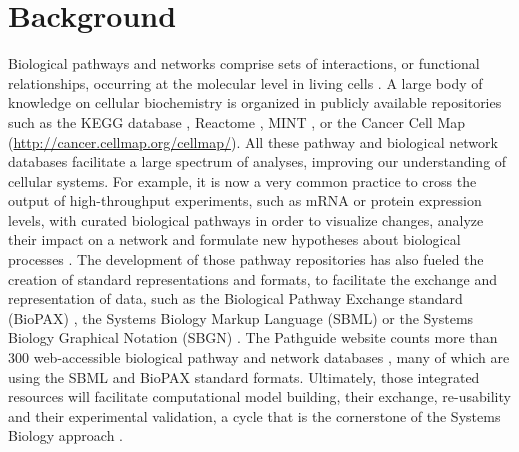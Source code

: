 \documentclass[10pt]{bmc_article}
\newenvironment{bmcformat}{\baselineskip20pt\sloppy\setboolean{publ}{false}}{\baselineskip20pt\sloppy}
\begin{document}
\begin{bmcformat}
\section*{Background}

Biological pathways and networks comprise sets of interactions, or functional
relationships, occurring at the molecular level in living cells
\cite{adriaens2008public, cary2005pathway}. 
A large body of knowledge on cellular biochemistry is organized in publicly available
repositories such as the KEGG database \cite{ogata1999kegg}, Reactome
\cite{joshi2005reactome}, MINT \cite{zanzoni2002mint}, or the Cancer Cell Map
(\url{http://cancer.cellmap.org/cellmap/}). All these pathway and biological
network databases facilitate a large spectrum of analyses, improving our
understanding of cellular systems. For example, it is now a very common
practice to cross the output of high-throughput experiments, such as mRNA or
protein expression levels, with curated biological pathways in
order to visualize changes, analyze their impact on a network and
formulate new hypotheses about
biological processes \cite{saraiya2005visualizing,
gehlenborg2010visualization}. The development of those pathway repositories has
also fueled the creation of standard representations and formats, to facilitate
the exchange and representation of data, such as the Biological Pathway
Exchange standard (BioPAX) \cite{demir2010biopax}, the Systems Biology Markup
Language (SBML) \cite{hucka2003systems} or the Systems Biology Graphical
Notation (SBGN) \cite{le2009systems}. The Pathguide website counts
more than 300 web-accessible biological pathway and network databases
\cite{bader2006pathguide}, many of which are using the SBML and BioPAX standard
formats. Ultimately, those integrated resources will facilitate computational
model building, their exchange, re-usability and their experimental validation, a cycle that is the
cornerstone of the Systems Biology approach \cite{karlebach2008modelling,
kitano2002systems, ideker2001new}.


\end{bmcformat}
\end{document}
